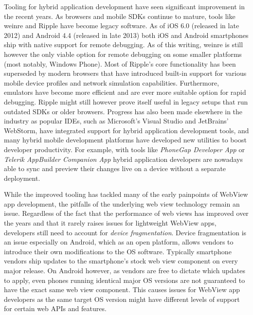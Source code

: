 \documentclass[thesis.tex]{subfiles}
\begin{document}
Tooling for hybrid application development have seen significant improvement in the recent years. As browsers and mobile SDKs continue to mature, tools like weinre and Ripple have become legacy software. As of iOS 6.0 (released in late 2012) and Android 4.4 (released in late 2013) both iOS and Android smartphones ship with native support for remote debugging. As of this writing, weinre is still however the only viable option for remote debugging on some smaller platforms (most notably, Windows Phone). Most of Ripple's core functionality has been superseded by modern browsers that have introduced built-in support for various mobile device profiles and network simulation capabilities. Furthermore, emulators have become more efficient and are ever more suitable option for rapid debugging. Ripple might still however prove itself useful in legacy setups that run outdated SDKs or older browsers. Progress has also been made elsewhere in the industry as popular IDEs, such as Microsoft's Visual Studio and JetBrains' WebStorm, have integrated support for hybrid application development tools, and many hybrid mobile development platforms have developed new utilities to boost developer productivity. For example, with tools like \textit{PhoneGap Developer App} or \textit{Telerik AppBuilder Companion App} hybrid application developers are nowadays able to sync and preview their changes live on a device without a separate deployment.

While the improved tooling has tackled many of the early painpoints of WebView app development, the pitfalls of the underlying web view technology remain an issue. Regardless of the fact that the performance of web views has improved over the years and that it rarely raises issues for lightweight WebView apps, developers still need to account for \textit{device fragmentation}. Device fragmentation is an issue especially on Android, which as an open platform, allows vendors to introduce their own modifications to the OS software. Typically smartphone vendors ship updates to the smartphone's stock web view component on every major release. On Android however, as vendors are free to dictate which updates to apply, even phones running identical major OS versions are not guaranteed to have the exact same web view component. This causes issues for WebView app developers as the same target OS version might have different levels of support for certain web APIs and features.
\end{document}
